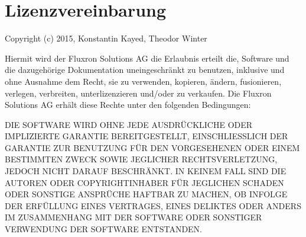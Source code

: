 \WFclear
\pagebreak
\section{Lizenzvereinbarung}
\label{Lizenzvereinbarung}

Copyright (c) 2015, Konstantin Kayed, Theodor Winter

Hiermit wird der Fluxron Solutions AG die Erlaubnis erteilt die, Software und die dazugehörige Dokumentation uneingeschränkt zu benutzen, inklusive und ohne Ausnahme dem Recht, sie zu verwenden, kopieren, ändern, fusionieren, verlegen, verbreiten, unterlizenzieren und/oder zu verkaufen. Die Fluxron Solutions AG erhält diese Rechte unter den folgenden Bedingungen:

DIE SOFTWARE WIRD OHNE JEDE AUSDRÜCKLICHE ODER IMPLIZIERTE GARANTIE BEREITGESTELLT, EINSCHLIESSLICH DER GARANTIE ZUR BENUTZUNG FÜR DEN VORGESEHENEN ODER EINEM BESTIMMTEN ZWECK SOWIE JEGLICHER RECHTSVERLETZUNG, JEDOCH NICHT DARAUF BESCHRÄNKT. IN KEINEM FALL SIND DIE AUTOREN ODER COPYRIGHTINHABER FÜR JEGLICHEN SCHADEN ODER SONSTIGE ANSPRÜCHE HAFTBAR ZU MACHEN, OB INFOLGE DER ERFÜLLUNG EINES VERTRAGES, EINES DELIKTES ODER ANDERS IM ZUSAMMENHANG MIT DER SOFTWARE ODER SONSTIGER VERWENDUNG DER SOFTWARE ENTSTANDEN.

\pagebreak

